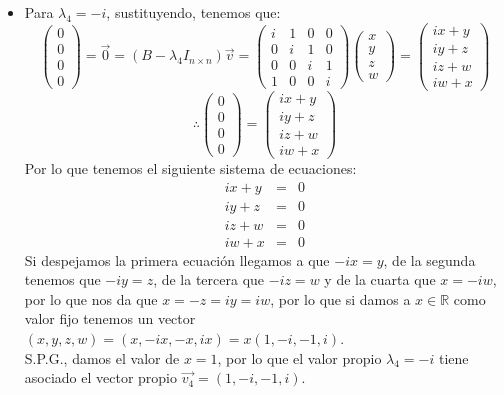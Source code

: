 \begin{enumerate}
\begin{itemize}
\item Para $\lambda_4=-i$, sustituyendo, tenemos que:
    \[\begin{pmatrix}0\\
0\\0\\0\end{pmatrix}=\vec{0}=(B-\lambda_4I_{n\times n })\vec{v}=\begin{pmatrix}i&1&0&0\\
0& i &1& 0\\
0&0&i&1\\
1&0&0&i\end{pmatrix}\begin{pmatrix}x\\
y\\z\\w\end{pmatrix}=\begin{pmatrix}ix+y\\
iy+z\\iz+w\\iw+x\end{pmatrix}\]
\[\therefore \begin{pmatrix}0\\
0\\0\\0\end{pmatrix}=\begin{pmatrix}ix+y\\
iy+z\\iz+w\\iw+x\end{pmatrix}\]
Por lo que tenemos el siguiente sistema de ecuaciones:
\begin{eqnarray*}
ix+y&=&0\\
iy+z&=&0\\iz+w&=&0\\iw+x&=&0
\end{eqnarray*}
Si despejamos la primera ecuaci\'on llegamos a que $-ix=y$, de la segunda tenemos que $-iy=z$, de la tercera que $-iz=w$ y de la cuarta que $x=-iw$, por lo que nos da que $x=-z=iy=iw$, por lo que si damos a $x\in\mathbb{R}$ como valor fijo tenemos un vector $(x,y,z,w)=(x,-ix,-x,ix)=x(1,-i,-1,i)$.\\
S.P.G., damos el valor de $x=1$, por lo que el valor propio $\lambda_4=-i$ tiene asociado el vector propio $\vec{v_4}=(1,-i,-1,i)$.


\end{itemize}
\end{enumerate}
